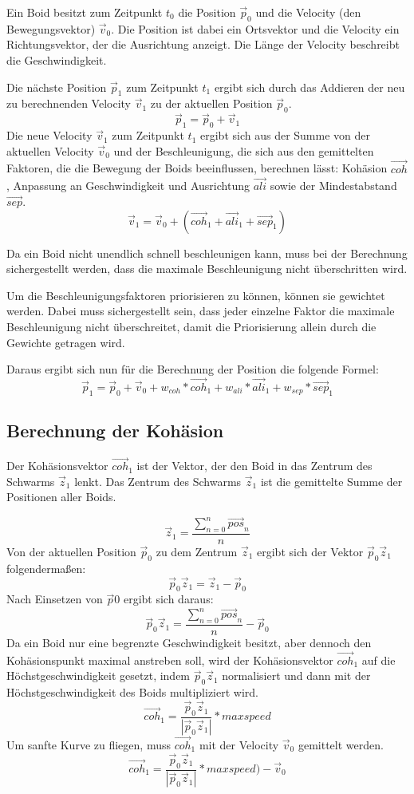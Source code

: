 \documentclass[draft=false
              ,paper=a4
              ,twoside=false
              ,fontsize=11pt
              ,headsepline
              ,BCOR10mm
              ,DIV11
              ,bibtotoc
              ,liststotoc
              ]{scrbook}
\begin{document}
Ein Boid besitzt zum Zeitpunkt \(t_0\) die Position \(\vec{p}_0\) und die Velocity (den Bewegungsvektor) \(\vec{v}_0\). Die Position ist dabei ein Ortsvektor und die Velocity ein Richtungsvektor, der die Ausrichtung anzeigt. Die Länge der Velocity beschreibt die Geschwindigkeit.

Die nächste Position \(\vec{p}_1\) zum Zeitpunkt \(t_1\) ergibt sich durch das Addieren der neu zu berechnenden Velocity \(\vec{v}_1\) zu der aktuellen Position \(\vec{p}_0\).
\[\vec{p}_1 = \vec{p}_0 + \vec{v}_1 \]
Die neue Velocity \(\vec{v}_1\) zum Zeitpunkt \(t_1\) ergibt sich aus der Summe von der aktuellen Velocity \(\vec{v}_0\) und der Beschleunigung, die sich aus den gemittelten Faktoren, die die Bewegung der Boids beeinflussen, berechnen lässt: Kohäsion \(\vec{coh}\), Anpassung an Geschwindigkeit und Ausrichtung \(\vec{ali}\) sowie der Mindestabstand \(\vec{sep}\).
\[\vec{v}_1 = \vec{v}_0 + (\vec{coh}_1 + \vec{ali}_1 + \vec{sep}_1)\]

Da ein Boid nicht unendlich schnell beschleunigen kann, muss bei der Berechnung sichergestellt werden, dass die maximale Beschleunigung nicht überschritten wird.

Um die Beschleunigungsfaktoren priorisieren zu können, können sie gewichtet werden. Dabei muss sichergestellt sein, dass jeder einzelne Faktor die maximale Beschleunigung nicht überschreitet, damit die Priorisierung allein durch die Gewichte getragen wird.

Daraus ergibt sich nun für die Berechnung der Position die folgende Formel:
\[\vec{p}_1 = \vec{p}_0 + \vec{v}_0 + w_{coh} * \vec{coh}_1 + w_{ali} * \vec{ali}_1 + w_{sep} * \vec{sep}_1\]

\subsection{Berechnung der Kohäsion}
Der Kohäsionsvektor \(\vec{coh}_1\) ist der Vektor, der den Boid in das Zentrum des Schwarms \(\vec{z}_1\) lenkt. Das Zentrum des Schwarms \(\vec{z}_1\) ist die gemittelte Summe der Positionen aller Boids.
 
\[\vec{z}_1 = \frac{\sum \limits_{n=0}^n \vec{pos}_n}{n} \]
Von der aktuellen Position \(\vec{p}_0\) zu dem Zentrum \(\vec{z}_1\) ergibt sich der Vektor \(\vec{p}_0\vec{z}_1\) folgendermaßen:
\[\vec{p}_0\vec{z}_1 = \vec{z}_1 - \vec{p}_0\]
Nach Einsetzen von \(\vec{p}0\) ergibt sich daraus:
\[\vec{p}_0\vec{z}_1 = \frac{\sum \limits_{n=0}^n \vec{pos}_n}{n} - \vec{p}_0\]
Da ein Boid nur eine begrenzte Geschwindigkeit besitzt, aber dennoch den Kohäsionspunkt maximal anstreben soll, wird der Kohäsionsvektor \(\vec{coh}_1\) auf die Höchstgeschwindigkeit gesetzt, indem \(\vec{p}_0\vec{z}_1\) normalisiert und dann mit der Höchstgeschwindigkeit des Boids multipliziert wird.
\[\vec{coh}_1 = \frac{\vec{p}_0\vec{z}_1}{|\vec{p}_0\vec{z}_1|} * maxspeed\]
Um sanfte Kurve zu fliegen, muss \(\vec{coh}_1\) mit der Velocity \(\vec{v}_0\) gemittelt werden.
\[\vec{coh}_1 = \frac{\vec{p}_0\vec{z}_1}{|\vec{p}_0\vec{z}_1|} * maxspeed) - \vec{v}_0\]
\end{document}
